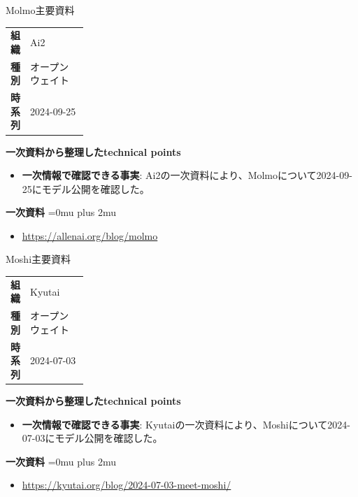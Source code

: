 \begin{technicalnote}{Molmo}{主要資料}
\begingroup
\begin{tabularx}{\linewidth}{@{}>{\bfseries}p{0.22\linewidth}X@{}}
組織 & Ai2 \\
種別 & オープンウェイト \\
時系列 & 2024-09-25 \\
\end{tabularx}
\smallskip
{\bfseries 一次資料から整理したtechnical points}
\begin{itemize}[leftmargin=1.5em,itemsep=0.35em]
\item \textbf{一次情報で確認できる事実}: Ai2の一次資料により、Molmoについて2024-09-25にモデル公開を確認した。
\end{itemize}
\begin{minipage}{\linewidth}
\begin{samepage}
{\bfseries 一次資料}
\begingroup\sloppy
\Urlmuskip=0mu plus 2mu\relax
\begin{itemize}[leftmargin=1.5em,itemsep=0.25em]
\item {\scriptsize\url{https://allenai.org/blog/molmo}}
\end{itemize}
\endgroup
\end{samepage}
\end{minipage}
\endgroup
\end{technicalnote}
\medskip

\begin{technicalnote}{Moshi}{主要資料}
\begingroup
\begin{tabularx}{\linewidth}{@{}>{\bfseries}p{0.22\linewidth}X@{}}
組織 & Kyutai \\
種別 & オープンウェイト \\
時系列 & 2024-07-03 \\
\end{tabularx}
\smallskip
{\bfseries 一次資料から整理したtechnical points}
\begin{itemize}[leftmargin=1.5em,itemsep=0.35em]
\item \textbf{一次情報で確認できる事実}: Kyutaiの一次資料により、Moshiについて2024-07-03にモデル公開を確認した。
\end{itemize}
\begin{minipage}{\linewidth}
\begin{samepage}
{\bfseries 一次資料}
\begingroup\sloppy
\Urlmuskip=0mu plus 2mu\relax
\begin{itemize}[leftmargin=1.5em,itemsep=0.25em]
\item {\scriptsize\url{https://kyutai.org/blog/2024-07-03-meet-moshi/}}
\end{itemize}
\endgroup
\end{samepage}
\end{minipage}
\endgroup
\end{technicalnote}
\medskip

